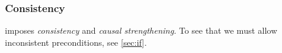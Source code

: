 


\subsubsection*{Consistency}
\jjr{} imposes \emph{consistency} and \emph{causal strengthening}.  To see
that we must allow inconsistent preconditions, see \textsection\ref{sec:if}.

